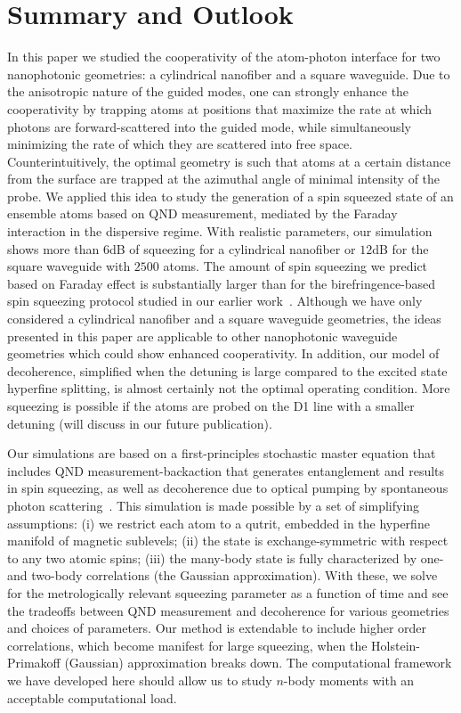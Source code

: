 \documentclass[preprint,aps,pra,onecolumn,superscriptaddress]{revtex4-1} %
\begin{document}
\section{Summary and Outlook}
In this paper we studied the cooperativity of the atom-photon interface for two nanophotonic geometries: a cylindrical nanofiber and a square waveguide.  Due to the anisotropic nature of the guided modes, one can strongly enhance the cooperativity by trapping atoms at positions that maximize the rate at which photons are forward-scattered  into the guided mode, while simultaneously minimizing the rate of which they are scattered into free space.  Counterintuitively, the optimal geometry is such that atoms at a certain distance from the surface are trapped at the azimuthal angle of minimal intensity of the probe.  We applied this idea to study the generation of a spin squeezed state of an ensemble atoms based on QND measurement, mediated by the Faraday interaction in the dispersive regime. 
With realistic parameters, our simulation shows more than $ 6 $dB of squeezing for a cylindrical nanofiber or $ 12 $dB for the square waveguide with $ 2500 $ atoms. The amount of spin squeezing we predict based on Faraday effect is substantially larger than for the birefringence-based spin squeezing protocol studied in our earlier work~\cite{Qi2016}.  Although we have only considered a cylindrical nanofiber and a square waveguide geometries, the ideas presented in this paper are applicable to other nanophotonic waveguide geometries which could show enhanced cooperativity.  In addition, our model of decoherence, simplified when the detuning is large compared to the excited state hyperfine splitting, is almost certainly not the optimal operating condition. {\color{blue}More squeezing is possible if the atoms are probed on the D1 line with a smaller detuning (will discuss in our future publication).}

Our simulations are based on a first-principles stochastic master equation that includes QND measurement-backaction that generates entanglement and results in spin squeezing, as well as decoherence due to optical pumping by spontaneous photon scattering~\cite{Norris2014, Baragiola2014, Qi2016}. This simulation is made possible by a set of simplifying assumptions: (i) we restrict each atom to a qutrit, embedded in the hyperfine manifold of magnetic sublevels; (ii) the state is exchange-symmetric with respect to any two atomic spins; (iii) the many-body state is fully characterized by one- and two-body correlations (the Gaussian approximation).   With these, we solve for the metrologically relevant squeezing parameter as a function of time and see the tradeoffs between QND measurement and decoherence for various geometries and choices of parameters.  Our method is extendable to include higher order correlations, which become manifest for large squeezing, when the Holstein-Primakoff (Gaussian) approximation breaks down.  The computational framework we have developed here should allow us to study $n$-body moments with an acceptable computational load. 
\end{document}
